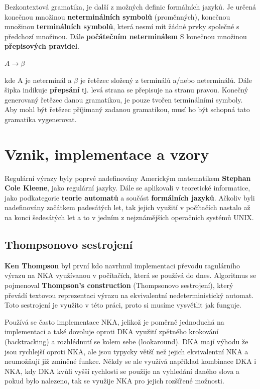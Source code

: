 Bezkontextová gramatika, je další z možných definic formálních jazyků. Je určená konečnou množinou \textbf{neterminálních symbolů} (proměnných), konečnou množinou \textbf{terminálních symbolů}, která nesmí mít žádné prvky společné s předchozí množinou.
Dále \textbf{počátečním neterminálem} S konečnou množinou \textbf{přepisových pravidel}\cite{Wikipedia_2021}.

$A \longrightarrow \beta$

\noindent 
kde A je neterminál a $\beta$ je řetězec složený z terminálů a/nebo neterminálů. 
Dále šipka indikuje \textbf{přepsání} tj. levá strana se přepisuje na stranu pravou.
Konečný generovaný řetězec danou gramatikou, je pouze tvořen terminálními symboly.
Aby mohl být řetězec příjimaný zadanou gramatikou, musí ho být schopná tato gramatika vygenerovat.

\section{Vznik, implementace a vzory}
Regulární výrazy byly poprvé nadefinovány Americkým matematikem \textbf{Stephan Cole Kleene}, jako regulární jazyky. 
Dále se aplikovali v teoretické informatice, jako podkategorie \textbf{teorie automatů} a součást \textbf{formálních jazyků}.
Ačkoliv byli nadefinovány začátkem padesátých let, tak jejich využití v počítačích nastalo až na konci šedesátých let a to v 
jedním z nejznámějších operačních systémů UNIX.

\subsection*{Thompsonovo sestrojení}

\textbf{Ken Thompson} byl první kdo navrhnul implementaci převodu ragulárního výrazu na NKA využívanou v počítačích, která se používá do dnes. 
Algoritmus se pojmenoval \textbf{Thompson's construction} (Thompsonovo sestrojení), který převádí textovou reprezentaci výrazu na ekvivalentní nedeterministický automat.
Toto sestrojení je využito v této práci, proto si musíme vysvětlit jak funguje.

Používá se často implementace NKA, jelikož je poměrně jednoduchá na implementaci a
také dovoluje oproti DKA využití zpětného krokování (backtracking) a rozhlédnutí se kolem sebe (lookaround).
DKA mají výhodu že jsou rychlejší oproti NKA, ale jsou typycky větší než jejich ekvivalentní NKA a neumožňují již zmíněné funkce. 
Někdy se ale využívá například kombinace DKA i NKA, kdy DKA kvůli vyšší rychlosti se použije na vyhledání daného slova a pokud bylo nalezeno, 
tak se využije NKA pro jejich rozšířené možnosti.

